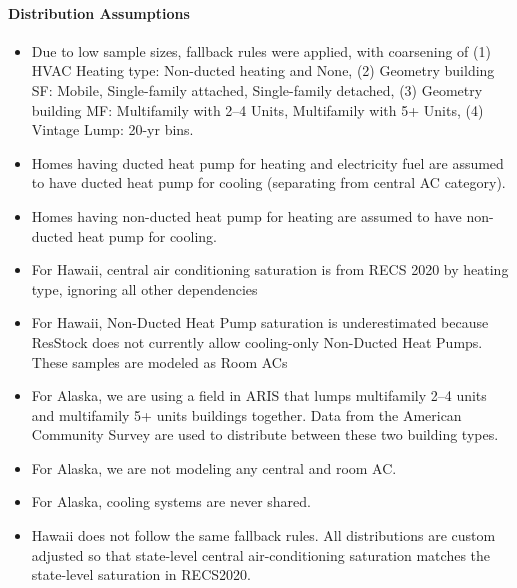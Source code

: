 \paragraph{Distribution Assumptions}
% 
\begin{itemize}
    \item Due to low sample sizes, fallback rules were applied, with coarsening of  (1) HVAC Heating type: Non-ducted heating and None, (2) Geometry building SF: Mobile, Single-family attached, Single-family detached, (3) Geometry building MF: Multifamily with 2--4 Units, Multifamily with 5+ Units, (4) Vintage Lump: 20-yr bins. 
    \item Homes having ducted heat pump for heating and electricity fuel are assumed to have ducted heat pump for cooling (separating from central AC category).
    \item Homes having non-ducted heat pump for heating are assumed to have non-ducted heat pump for cooling.
    \item For Hawaii, central air conditioning saturation is from RECS 2020 by heating type, ignoring all other dependencies
    \item For Hawaii, Non-Ducted Heat Pump saturation is underestimated because ResStock does not currently allow cooling-only Non-Ducted Heat Pumps. These samples are modeled as Room ACs
    \item For Alaska, we are using a field in ARIS that lumps multifamily 2--4 units and multifamily 5+ units buildings together. Data from the American Community Survey are used to distribute between these two building types.
    \item For Alaska, we are not modeling any central and room AC.
    \item For Alaska, cooling systems are never shared.
    \item Hawaii does not follow the same fallback rules. All distributions are custom adjusted so that state-level central air-conditioning saturation matches the state-level saturation in RECS2020.
\end{itemize}
